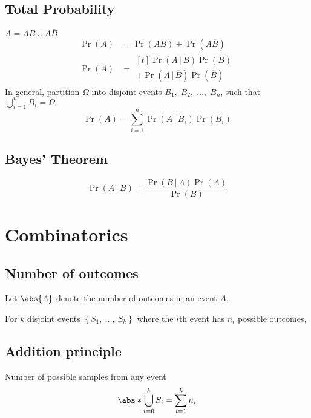 \documentclass{article}
\begin{document}
\begin{multicols}{3}
    \subsection{Total Probability}
    \(A = AB \cup A\overline{B}\)
    \begin{align*}
        \Pr{\left( A \right)} & = \Pr{\left( AB \right)} + \Pr{\left( A\overline{B} \right)} \\
        \Pr{\left( A \right)} & = \begin{aligned}[t]
                                      \Pr{\left( A \,\vert\, B \right)}\Pr{\left( B \right)} \\
                                      + \Pr{\left( A \,\vert\, \overline{B} \right)}\Pr{\left( \overline{B} \right)}
                                  \end{aligned}
    \end{align*}
    In general, partition \(\Omega\) into disjoint events \(B_1,\; B_2,\; \dots,\; B_n\),
    such that \(\bigcup_{i=1}^n B_i = \Omega\)
    \begin{equation*}
        \Pr{\left( A \right)} = \sum_{i = 1}^n \Pr{\left( A \,\vert\, B_i \right)}\Pr{\left( B_i \right)}
    \end{equation*}
    \subsection{Bayes' Theorem}
    \begin{equation*}
        \Pr{\left( A \,\vert\, B \right)} = \frac{\Pr{\left( B \,\vert\, A \right)}\Pr{\left( A \right)}}{\Pr{\left( B \right)}}
    \end{equation*}
    \section{Combinatorics}
    \subsection{Number of outcomes}
    Let \(\abs{A}\) denote the number of outcomes in an event \(A\).

    For \(k\) disjoint events \({\left\{ S_1,\:\ldots,\:S_k \right\}}\)
    where the \(i\)th event has \(n_i\) possible outcomes,
    \subsection{Addition principle}
    Number of possible samples from any event
    \begin{equation*}
        \abs*{\bigcup_{i = 0}^{k} S_i} = \sum_{i = 1}^k n_i
    \end{equation*}

\end{multicols}
\end{document}
